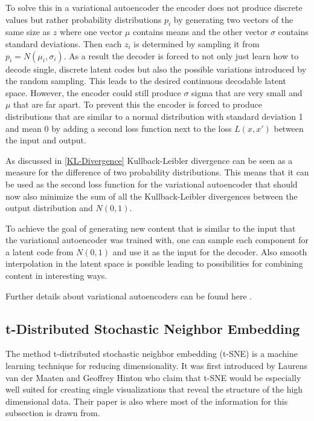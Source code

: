 To solve this in a variational autoencoder the encoder does not produce discrete values but rather
probability distributions $p_{i}$ by generating two vectors of the same size as $z$ where one vector $\mu$
contains means and the other vector $\sigma$ contains standard deviations.
Then each $z_{i}$ is determined by sampling it from $p_{i}=N(\mu_{i},\sigma_{i})$.
As a result the decoder is forced to not 
only just learn how to decode single, discrete latent codes but also the possible variations
introduced by the random sampling. This leads to the desired continuous decodable latent space.
However, the encoder could still produce $\sigma$ sigma that are very small and $\mu$ that are far apart.
To prevent this the encoder is forced to produce distributions that are similar to a normal
distribution with standard deviation 1 and mean 0 by adding a second loss function next to the
loss $L(x,x')$ between the input and output.

As discussed in \ref{KL-Divergence} Kullback-Leibler divergence can be seen as a measure for the
difference of two probability distributions. This means that it can be used as the second loss
function for the variational autoencoder that should now also minimize the sum
of all the Kullback-Leibler divergences between the output distribution and $N(0,1)$.

To achieve the goal of generating new content that is similar to the input that the variational 
autoencoder was trained with, one can sample each component for a latent code from $N(0,1)$ and
use it as the input for the decoder.
Also smooth interpolation in the latent space is possible leading to possibilities for combining
content in interesting ways.

Further details about variational autoencoders can be found here \parencite{2016-doersch-tutorial}.

\subsection{t-Distributed Stochastic Neighbor Embedding} \label{t-sne}

The method t-distributed stochastic neighbor embedding (t-SNE) is a machine learning technique for reducing
dimensionality. It was first 
introduced by Laurens van der Maaten and Geoffrey Hinton \parencite{2008-vanDerMaaten-visualizing} who
claim that t-SNE would be especially well suited for creating single visualizations that reveal the 
structure of the high dimensional data. Their paper is also where most of the information for this 
subsection is drawn from.

